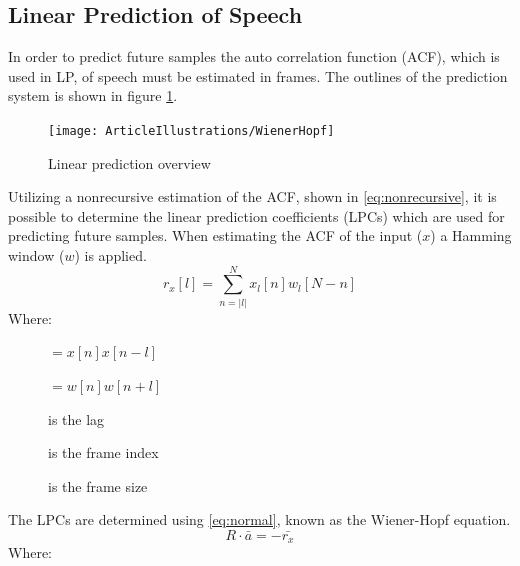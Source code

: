 \subsection{Linear Prediction of Speech}
In order to predict future samples the auto correlation function (ACF), which is used in LP, of speech must be estimated in frames. The outlines of the prediction system is shown in figure \ref{fig:LinearPredictionOverview}.

\begin{figure}[H]
	\centering
	\texttt{[image: ArticleIllustrations/WienerHopf]}
	\caption{Linear prediction overview}
	\label{fig:LinearPredictionOverview}
\end{figure}


Utilizing a nonrecursive estimation of the ACF, shown in \autoref{eq:nonrecursive}, it is possible to determine the linear prediction coefficients (LPCs) which are used for predicting future samples. When estimating the ACF of the input ($x$) a Hamming window ($w$) is applied.
\begin{equation}\label{eq:nonrecursive}
r_x[l] = \sum^{N}_{n=\left| l\right|} x_l[n]w_l[N-n]
\end{equation}
Where:
\vspace{-8mm}
\begin{description}
	\item[] $=x[n]x[n-l]$ 
	\item[] $=w[n]w[n+l]$
	\item[] is the lag 
	\item[] is the frame index
	\item[] is the frame size
\end{description}
The LPCs are determined using \autoref{eq:normal}, known as the Wiener-Hopf equation.
\begin{equation}\label{eq:normal}
R \cdot \bar{a} = -\bar{r_x}
\end{equation}
Where:
\vspace{-8mm} %
